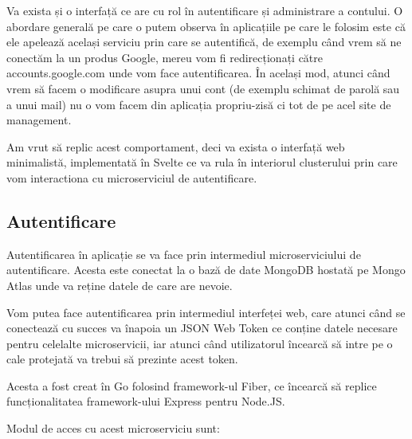 Va exista și o interfață ce are cu rol în autentificare și administrare a contului. O abordare generală
pe care o putem observa în aplicațiile pe care le folosim este că ele apelează același serviciu
prin care se autentifică, de exemplu când vrem să ne conectăm la un produs Google, mereu
vom fi redirecționați către accounts.google.com unde vom face autentificarea. În același mod,
atunci când vrem să facem o modificare asupra unui cont (de exemplu schimat de parolă sau a unui mail)
nu o vom facem din aplicația propriu-zisă ci tot de pe acel site de management.

Am vrut să replic acest comportament, deci va exista o interfață web minimalistă, implementată în Svelte
ce va rula în interiorul clusterului prin care vom interactiona cu microserviciul de autentificare.

\subsection{Autentificare}

Autentificarea în aplicație se va face prin intermediul microserviciului de autentificare. Acesta este
conectat la o bază de date MongoDB hostată pe Mongo Atlas unde va reține datele de care are nevoie.

Vom putea face autentificarea prin intermediul interfeței web, care atunci când se conectează cu succes
va înapoia un JSON Web Token ce conține datele necesare pentru celelalte microservicii, iar atunci când utilizatorul
încearcă să intre pe o cale protejată va trebui să prezinte acest token.

Acesta a fost creat în Go folosind framework-ul Fiber, ce încearcă să replice funcționalitatea
framework-ului Express pentru Node.JS.

Modul de acces cu acest microserviciu sunt:

